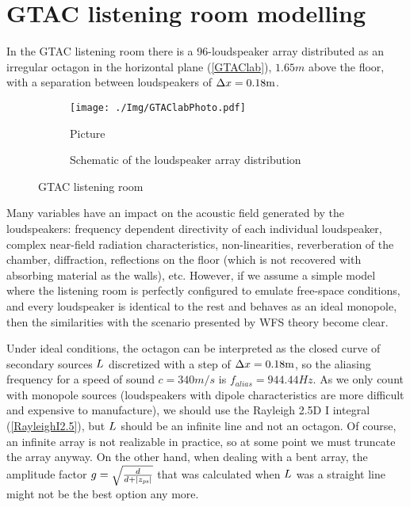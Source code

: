 \section{GTAC listening room modelling}
In the GTAC listening room there is a 96-loudspeaker array distributed as an irregular octagon in the horizontal plane (\autoref{GTAClab}), $1.65 \si{m}$ above the floor, with a separation between loudspeakers of $\secondarySourceSeparation = 0.18 \si{m}$. 

\begin{figure}
	\centering
	\begin{subfigure}[c]{0.55\textwidth}
		\centering
		\texttt{[image: ./Img/GTAClabPhoto.pdf]}
		\caption{Picture \cite{Czy2011}}
		\label{GTAClabPhoto}
	\end{subfigure}
	\begin{subfigure}[c]{0.35\textwidth}
		\centering
		\caption[WFS array distribution]{Schematic of the loudspeaker array distribution}
		\label{WFSdistribution}
	\end{subfigure}
	\caption{GTAC listening room}
	\label{GTAClab}
\end{figure}

Many variables have an impact on the acoustic field generated by the loudspeakers: frequency dependent directivity of each individual loudspeaker, complex near-field radiation characteristics, non-linearities, reverberation of the chamber, diffraction, reflections on the floor (which is not recovered with absorbing material as the walls), etc. However, if we assume a simple model where the listening room is perfectly configured to emulate free-space conditions, and every loudspeaker is identical to the rest and behaves as an ideal monopole, then the similarities with the scenario presented by WFS theory become clear.

Under ideal conditions, the octagon can be interpreted as the closed curve of secondary sources $\sectionTheo$ discretized with a step of $\secondarySourceSeparation = 0.18 \si{m}$, so the aliasing frequency for a speed of sound $c = 340 \si{m/s}$ is $f_\mathit{alias} = 944.44\si{Hz}$.  As we only count with monopole sources (loudspeakers with dipole characteristics are more difficult and expensive to manufacture), we should use the Rayleigh 2.5D I integral (\autoref{RayleighI2.5}), but $\sectionTheo$ should be an infinite line and not an octagon. Of course, an infinite array is not realizable in practice, so at some point we must truncate the array anyway. On the other hand, when dealing with a bent array, the amplitude factor $g = \sqrt{\frac{d}{d + \abs{\PosTheo[primarySource][z]}}}$ that was calculated when $\sectionTheo$ was a straight line might not be the best option any more.

